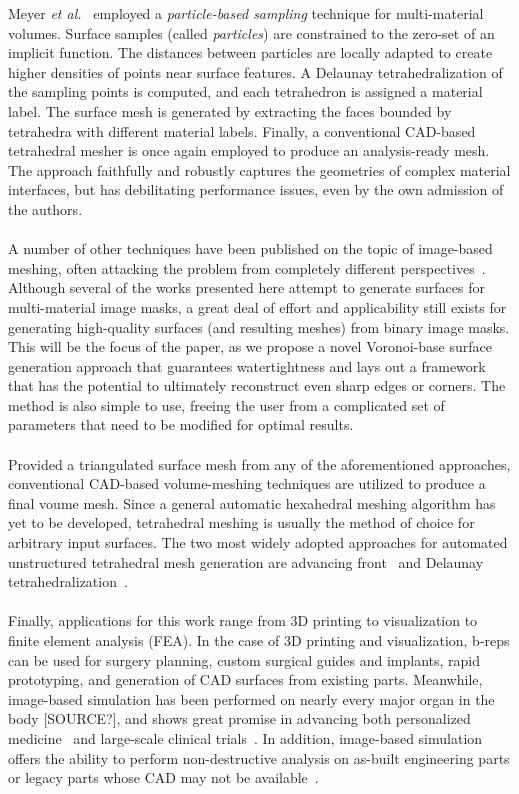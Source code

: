 %
Meyer \textit{et al.}~\cite{meyer_2008} employed a \textit{particle-based sampling} technique for multi-material volumes. Surface samples (called \textit{particles}) are constrained to the zero-set of an implicit function. The distances between particles are locally adapted to create higher densities of points near surface features. A Delaunay tetrahedralization of the sampling points is computed, and each tetrahedron is assigned a material label. The surface mesh is generated by extracting the faces bounded by tetrahedra with different material labels. Finally, a conventional CAD-based tetrahedral mesher is once again employed to produce an analysis-ready mesh. The approach faithfully and robustly captures the geometries of complex material interfaces, but has debilitating performance issues, even by the own admission of the authors. \\ \\
%
A number of other techniques have been published on the topic of image-based meshing, often attacking the problem from completely different perspectives~\cite{bronson_2014,fang_2009,boissonnat_2009,zhao_2016}. Although several of the works presented here attempt to generate surfaces for multi-material image masks, a great deal of effort and applicability still exists for generating high-quality surfaces (and resulting meshes) from binary image masks. This will be the focus of the paper, as we propose a novel Voronoi-base surface generation approach that guarantees watertightness and lays out a framework that has the potential to ultimately reconstruct even sharp edges or corners. The method is also simple to use, freeing the user from a complicated set of parameters that need to be modified for optimal results. \\ \\
%
Provided a triangulated surface mesh from any of the aforementioned approaches, conventional CAD-based volume-meshing techniques are utilized to produce a final voume mesh. Since a general automatic hexahedral meshing algorithm has yet to be developed, tetrahedral meshing is usually the method of choice for arbitrary input surfaces. The two most widely adopted approaches for automated unstructured tetrahedral mesh generation are advancing front~\cite{jin_1993, lohner_1988} and Delaunay tetrahedralization~\cite{lohner_1997}. \\ \\
%
Finally, applications for this work range from 3D printing to visualization to finite element analysis (FEA). In the case of 3D printing and visualization, b-reps can be used for surgery planning, custom surgical guides and implants, rapid prototyping, and generation of CAD surfaces from existing parts. Meanwhile, image-based simulation has been performed on nearly every major organ in the body [SOURCE?], and shows great promise in advancing both personalized medicine~\cite{neal2010current} and large-scale clinical trials~\cite{viceconti2016silico}. In addition, image-based simulation offers the ability to perform non-destructive analysis on as-built engineering parts or legacy parts whose CAD may not be available~\cite{bradley2005advances}.\\ \\
